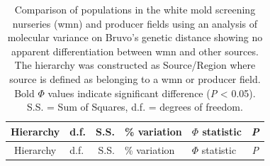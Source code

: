 \documentclass[fleqn,10pt,lineno]{wlpeerj} %
\theoremstyle{definition}
\theoremstyle{definition}
\theoremstyle{definition}
\theoremstyle{remark}
\begin{document}
\begin{longtable}[]{@{}clrllc@{}}
\caption{\label{tab:amova} Comparison of populations in the white mold
screening nurseries (wmn) and producer fields using an analysis of
molecular variance on Bruvo's genetic distance showing no apparent
differentiation between wmn and other sources. The hierarchy was
constructed as Source/Region where source is defined as belonging to a
wmn or producer field. Bold \(\Phi\) values indicate significant
difference (\emph{P} \textless{} 0.05). S.S. = Sum of Squares, d.f. =
degrees of freedom.}\tabularnewline
\toprule
\begin{minipage}[b]{0.32\columnwidth}\centering\strut
Hierarchy\strut
\end{minipage} & \begin{minipage}[b]{0.06\columnwidth}\raggedright\strut
d.f.\strut
\end{minipage} & \begin{minipage}[b]{0.07\columnwidth}\raggedleft\strut
S.S.\strut
\end{minipage} & \begin{minipage}[b]{0.13\columnwidth}\raggedright\strut
\% variation\strut
\end{minipage} & \begin{minipage}[b]{0.19\columnwidth}\raggedright\strut
\(\Phi\) statistic\strut
\end{minipage} & \begin{minipage}[b]{0.07\columnwidth}\centering\strut
\emph{P}\strut
\end{minipage}\tabularnewline
\midrule
\endfirsthead
\toprule
\begin{minipage}[b]{0.32\columnwidth}\centering\strut
Hierarchy\strut
\end{minipage} & \begin{minipage}[b]{0.06\columnwidth}\raggedright\strut
d.f.\strut
\end{minipage} & \begin{minipage}[b]{0.07\columnwidth}\raggedleft\strut
S.S.\strut
\end{minipage} & \begin{minipage}[b]{0.13\columnwidth}\raggedright\strut
\% variation\strut
\end{minipage} & \begin{minipage}[b]{0.19\columnwidth}\raggedright\strut
\(\Phi\) statistic\strut
\end{minipage} & \begin{minipage}[b]{0.07\columnwidth}\centering\strut
\emph{P}\strut

\end{minipage}
\end{longtable}
\end{document}
